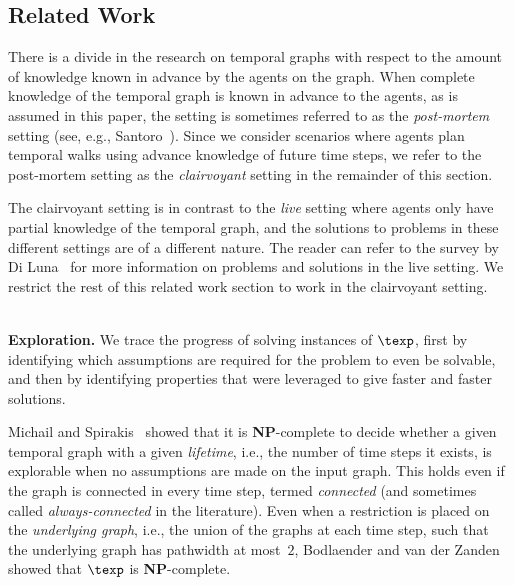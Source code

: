 \subsection{Related Work}
\label{subsec:related-work}

There is a divide in the research on temporal graphs with respect to the
amount of knowledge known in advance by the agents on the graph.  When
complete knowledge of the temporal graph is known in advance to the agents,
as is assumed in this paper, the setting is
sometimes referred to as the \emph{post-mortem}
setting (see, e.g., Santoro~\cite{Santoro15}). Since we consider
scenarios where agents plan temporal walks using advance knowledge
of future time steps, we refer to the post-mortem
setting as the {\em clairvoyant} setting in the remainder of this section.

The clairvoyant setting is in contrast to the \emph{live} setting where agents only have partial
knowledge of the temporal graph, and the solutions to problems in these
different settings are of a different nature.  The reader can refer to the
survey by Di Luna~\cite{DiLuna19} for more information on problems and
solutions in the live setting.  We restrict the rest of this related work
section to work in the clairvoyant setting.


~\\ \noindent \textbf{Exploration.} 
%
%
We trace the progress of solving instances of $\texp$, first by identifying
which assumptions are required for the problem to even be solvable, and then by
identifying properties that were leveraged to give faster and faster solutions. 

Michail and Spirakis~\cite{MichailS14,MichailS16} showed that it is
\textbf{NP}-complete to decide whether a given temporal graph with a given
\textit{lifetime}, i.e., the number of time steps it exists, is explorable when
no assumptions are made on the input graph. This holds even if the graph is connected in
every time step, termed \textit{connected} (and sometimes called \emph{always-connected}
in the literature).
Even when a restriction is placed on the \textit{underlying graph}, i.e., the
union of the graphs at each time step, such that the underlying graph has
pathwidth at most~$2$, Bodlaender and van der Zanden~\cite{BodlaenderV19} showed
that $\texp$ is \textbf{NP}-complete. 

